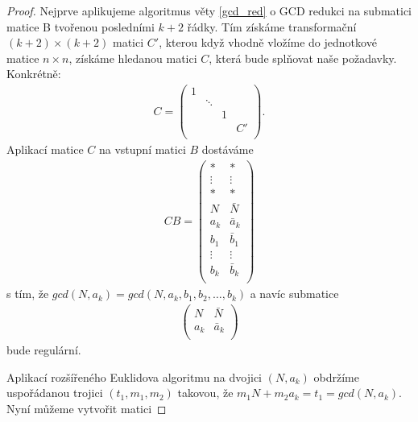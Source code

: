 \begin{proof}
Nejprve aplikujeme algoritmus věty \ref{gcd_red} o GCD redukci na submatici
matice B tvořenou posledními $ k + 2 $ řádky. Tím získáme transformační
$ (k + 2) \times (k + 2) $ matici $ C' $, kterou když vhodně vložíme do jednotkové
matice $ n \times n $, získáme hledanou matici $ C $, která bude splňovat naše
požadavky. Konkrétně:
\begin{align*}
C =
    \begin{pmatrix}
        1 &        &   &    \\
          & \ddots &   &    \\
          &        & 1 &    \\
          &        &   & C' \\
    \end{pmatrix}
.
\end{align*}
Aplikací matice $ C $ na vstupní matici $ B $ dostáváme
\begin{align*}
CB =
    \begin{pmatrix}
        \ast   & \ast   \\
        \vdots & \vdots \\
        \ast   & \ast   \\
        N      & \bar{N} \\
        a_k    & \bar{a}_k  \\
        b_1    & \bar{b}_1  \\
        \vdots & \vdots  \\
        b_k    & \bar{b}_k  \\
    \end{pmatrix}
\end{align*}
s tím, že $ gcd(N, a_k) = gcd(N, a_k, b_1, b_2, \dots, b_k) $ a navíc submatice
\begin{align*}
    \begin{pmatrix}
        N      & \bar{N} \\
        a_k    & \bar{a}_k  \\
    \end{pmatrix}
\end{align*}
bude regulární.

Aplikací rozšířeného Euklidova algoritmu na dvojici $ (N, a_k) $ obdržíme
uspořádanou trojici $ (t_1, m_1, m_2) $ takovou, že
$ m_1 N + m_2 a_k = t_1 = gcd(N, a_k) $. Nyní můžeme vytvořit matici


\end{proof}
